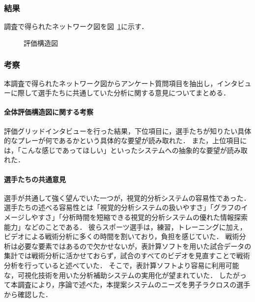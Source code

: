\documentclass[sotsuron]{kuee}
\begin{document}
			\subsubsection{結果}	
				調査で得られたネットワーク図を図~\ref{fig:egrid}に示す．
					\begin{figure}
						\begin{center}
						\end{center}
						\caption{評価構造図}
				  		\label{fig:egrid}
					\end{figure}
			\subsubsection{考察}
				本調査で得られたネットワーク図からアンケート質問項目を抽出し，インタビューに際して選手たちに共通していた分析に関する意見についてまとめる．
				\paragraph{全体評価構造図に関する考察}
					評価グリッドインタビューを行った結果，下位項目に，選手たちが知りたい具体的なプレーが何であるかという具体的な要望が読み取れた．
					また，上位項目には，「こんな感じであってほしい」といったシステムへの抽象的な要望が読み取れた．
				\paragraph{選手たちの共通意見}
					選手が共通して強く望んでいた一つが，視覚的分析システムの容易性であった．
					選手たちの述べる容易性とは「視覚的分析システムの扱いやすさ」「グラフのイメージしやすさ」「分析時間を短縮できる視覚的分析システムの優れた情報探索能力」などのことである．
					彼らスポーツ選手は，練習，トレーニングに加え，ビデオによる戦術分析に多くの時間を割いており，負担を感じていた．
					戦術分析は必要な要素ではあるので欠かせないが，表計算ソフトを用いた試合データの集計では戦術分析に活かせておらず，試合のすべてのビデオを見直すことで戦術分析を行っていると述べていた．
					そこで，表計算ソフトより容易に利用可能な，可視化技術を用いた分析補助システムの実用化が望まれていた．
					したがって本調査により，序論で述べた，本提案システムのニーズを男子ラクロスの選手から確認した．
\end{document}
